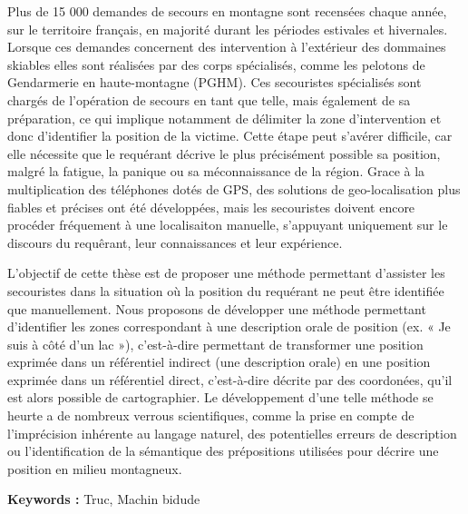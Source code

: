 Plus de 15 000 demandes de secours en montagne sont recensées chaque
année, sur le territoire français, en majorité durant les périodes
estivales et hivernales. Lorsque ces demandes concernent des
intervention à l'extérieur des dommaines skiables elles sont réalisées
par des corps spécialisés, comme les pelotons de Gendarmerie en
haute-montagne (PGHM). Ces secouristes spécialisés sont chargés de
l'opération de secours en tant que telle, mais également de sa
préparation, ce qui implique notamment de délimiter la zone
d'intervention et donc d'identifier la position de la victime. Cette
étape peut s'avérer difficile, car elle nécessite que le requérant
décrive le plus précisément possible sa position, malgré la fatigue,
la panique ou sa méconnaissance de la région. Grace à la
multiplication des téléphones dotés de GPS, des solutions de
geo-localisation plus fiables et précises ont été développées, mais
les secouristes doivent encore procéder fréquement à une localisaiton
manuelle, s'appuyant uniquement sur le discours du requêrant, leur
connaissances et leur expérience. 

L'objectif de cette thèse est de proposer une méthode permettant
d'assister les secouristes dans la situation où la position du
requérant ne peut être identifiée que manuellement. Nous proposons de
développer une méthode permettant d'identifier les zones correspondant
à une description orale de position (ex. « Je suis à côté d'un lac »),
c'est-à-dire permettant de transformer une position exprimée dans un
référentiel indirect (une description orale) en une position exprimée
dans un référentiel direct, c'est-à-dire décrite par des coordonées,
qu'il est alors possible de cartographier. Le développement d'une
telle méthode se heurte a de nombreux verrous scientifiques, comme la
prise en compte de l'imprécision inhérente au langage naturel, des
potentielles erreurs de description ou l’identification de la
sémantique des prépositions utilisées pour décrire une position en
milieu montagneux.

\vspace{.5cm}

\noindent\textbf{Keywords :} Truc, Machin bidude\par